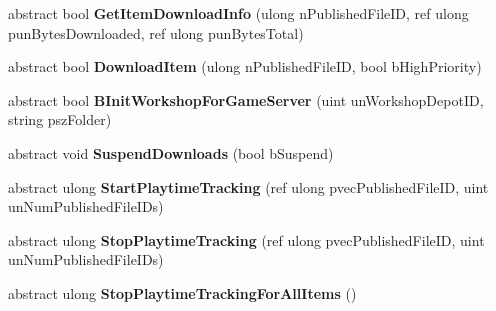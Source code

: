 \begin{DoxyCompactItemize}
\item 
\mbox{\label{class_valve_1_1_steamworks_1_1_i_steam_u_g_c_ac5dac4c1b263437f4915385b864c7229}} 
abstract bool {\bfseries Get\+Item\+Download\+Info} (ulong n\+Published\+File\+ID, ref ulong pun\+Bytes\+Downloaded, ref ulong pun\+Bytes\+Total)
\item 
\mbox{\label{class_valve_1_1_steamworks_1_1_i_steam_u_g_c_a5f42ab38efdec41a7ea6c02cbb03fb7d}} 
abstract bool {\bfseries Download\+Item} (ulong n\+Published\+File\+ID, bool b\+High\+Priority)
\item 
\mbox{\label{class_valve_1_1_steamworks_1_1_i_steam_u_g_c_a9024ad45aef22bc76d7a85691aaa122c}} 
abstract bool {\bfseries B\+Init\+Workshop\+For\+Game\+Server} (uint un\+Workshop\+Depot\+ID, string psz\+Folder)
\item 
\mbox{\label{class_valve_1_1_steamworks_1_1_i_steam_u_g_c_ac53524fb531941a66875523c63797fe2}} 
abstract void {\bfseries Suspend\+Downloads} (bool b\+Suspend)
\item 
\mbox{\label{class_valve_1_1_steamworks_1_1_i_steam_u_g_c_a44648f144bdbca0d0156557521d408aa}} 
abstract ulong {\bfseries Start\+Playtime\+Tracking} (ref ulong pvec\+Published\+File\+ID, uint un\+Num\+Published\+File\+I\+Ds)
\item 
\mbox{\label{class_valve_1_1_steamworks_1_1_i_steam_u_g_c_a1d4ab9fb41e4adcb5fe0ba4f7e46cb30}} 
abstract ulong {\bfseries Stop\+Playtime\+Tracking} (ref ulong pvec\+Published\+File\+ID, uint un\+Num\+Published\+File\+I\+Ds)
\item 
\mbox{\label{class_valve_1_1_steamworks_1_1_i_steam_u_g_c_a12ca173e1c9c58e3d015964396eeb62f}} 
abstract ulong {\bfseries Stop\+Playtime\+Tracking\+For\+All\+Items} ()
\item 
\mbox{\label{class_valve_1_1_steamworks_1_1_i_steam_u_g_c_a4d1900f76b431706926428b9eb093720}} 

\end{DoxyCompactItemize}

